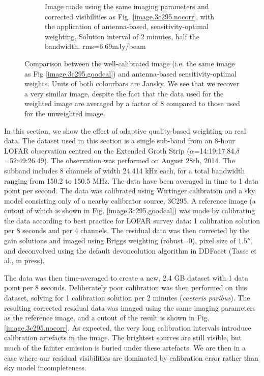 \begin{figure}
\begin{subfigure}{.43\textwidth}
\caption{\label{image.3c295.antcorr} Image made using the same imaging parameters and corrected visibilities as Fig. \ref{image.3c295.nocorr}, with the application of antenna-based, sensitivity-optimal weighting. Solution interval of 2 minutes, half the bandwidth. rms=6.69mJy/beam}
\end{subfigure}
\caption{\label{image.twoRealImages}Comparison between the well-calibrated image (i.e. the same image as Fig \ref*{image.3c295.goodcal}) and antenna-based sensitivity-optimal weights.  {Units of both colourbars are Jansky}. We see that we recover a very similar image, despite the fact that the data used for the weighted image are averaged by a factor of 8 compared to those used for the unweighted image.}
\end{figure}




\pg
In this section, we show the effect of adaptive quality-based weighting on real data. The dataset used in this section is a single sub-band from an 8-hour LOFAR observation centred on the Extended Groth Strip ($\alpha$=14:19:17.84,$\delta$=52:49:26.49). The observation was performed on August 28th, 2014. The subband includes 8 channels of width 24.414 kHz each, for a total bandwidth ranging from 150.2 to 150.5 MHz. The data have been averaged in time to 1 data point per second. The data was calibrated using Wirtinger calibration \citep[see][and references therein]{2014arXiv1410.8706T,2015MNRAS.449.2668S} and a sky model consisting only of a nearby calibrator source, 3C295. A reference image (a cutout of which is shown in Fig. \ref{image.3c295.goodcal}) was made by calibrating the data according to best practice for LOFAR survey data: 1 calibration solution per 8 seconds and per 4 channels. {The residual data was then corrected by the gain solutions and imaged} using Briggs weighting (robust=0), pixel size of $1.5''$, and deconvolved using the default devoncolution algorithm in DDFacet (Tasse et al., in press).

\pg
The data was then time-averaged to create a new, 2.4 GB dataset with 1 data point per 8 seconds. Deliberately poor calibration was then performed on this dataset, solving for 1 calibration solution per 2 minutes ({\it caeteris paribus}). The resulting corrected residual data was imaged using the same imaging parameters as the reference image, and a cutout of the result is shown in Fig. \ref{image.3c295.nocorr}. As expected, the very long calibration intervals introduce calibration artefacts in the image. The brightest sources are still visible, but much of the fainter emission is buried under these artefacts. We are then in a case where our residual visibilities are dominated by calibration error rather than sky model incompleteness.


